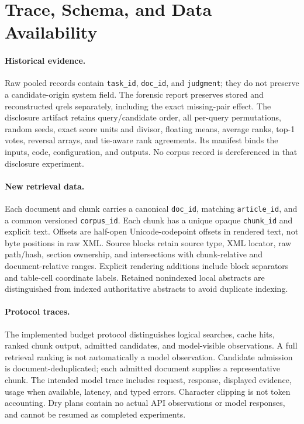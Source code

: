 \documentclass{article}
\begin{document}
\section{Trace, Schema, and Data Availability}
\label{app:trace}
\paragraph{Historical evidence.}
Raw pooled records contain \texttt{task\_id}, \texttt{doc\_id}, and \texttt{judgment}; they do not preserve a candidate-origin system field. The forensic report preserves stored and reconstructed qrels separately, including the exact missing-pair effect. The disclosure artifact retains query/candidate order, all per-query permutations, random seeds, exact score units and divisor, floating means, average ranks, top-1 votes, reversal arrays, and tie-aware rank agreements. Its manifest binds the inputs, code, configuration, and outputs. No corpus record is dereferenced in that disclosure experiment.

\paragraph{New retrieval data.}
Each document and chunk carries a canonical \texttt{doc\_id}, matching \texttt{article\_id}, and a common versioned \texttt{corpus\_id}. Each chunk has a unique opaque \texttt{chunk\_id} and explicit text. Offsets are half-open Unicode-codepoint offsets in rendered text, not byte positions in raw XML. Source blocks retain source type, XML locator, raw path/hash, section ownership, and intersections with chunk-relative and document-relative ranges. Explicit rendering additions include block separators and table-cell coordinate labels. Retained nonindexed local abstracts are distinguished from indexed authoritative abstracts to avoid duplicate indexing.

\paragraph{Protocol traces.}
The implemented budget protocol distinguishes logical searches, cache hits, ranked chunk output, admitted candidates, and model-visible observations. A full retrieval ranking is not automatically a model observation. Candidate admission is document-deduplicated; each admitted document supplies a representative chunk. The intended model trace includes request, response, displayed evidence, usage when available, latency, and typed errors. Character clipping is not token accounting. Dry plans contain no actual API observations or model responses, and cannot be resumed as completed experiments.
\end{document}
